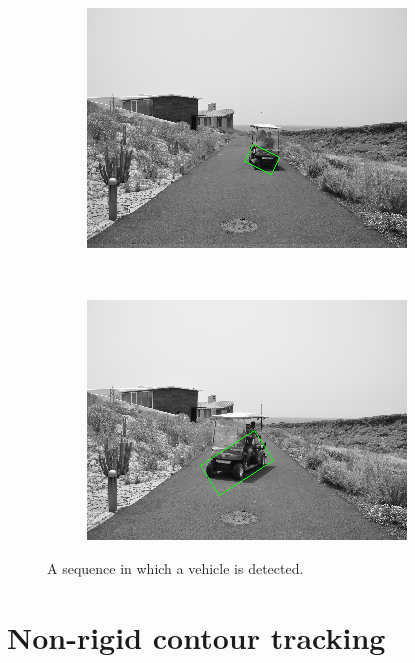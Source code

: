 \begin{figure}[h!]
\begin{subfigure}[b]{0.24\columnwidth}
	    \includegraphics[width=\textwidth]{sequence/seq7}\label{fig:seq7}
        \end{subfigure}%
        ~
        \begin{subfigure}[b]{0.24\columnwidth}
	    \includegraphics[width=\textwidth]{sequence/seq8}\label{fig:seq8}
        \end{subfigure}%
        \caption{A sequence in which a vehicle is detected.}\label{fig:cp01_sequence_example}
\end{figure}

\FloatBarrier
 
\graphicspath{{./images/chapter02/bmps/}{./images/chapter02/vects/}{./images/chapter02/}}
\section{Non-rigid contour tracking}\label{ch:chapter02_02}

